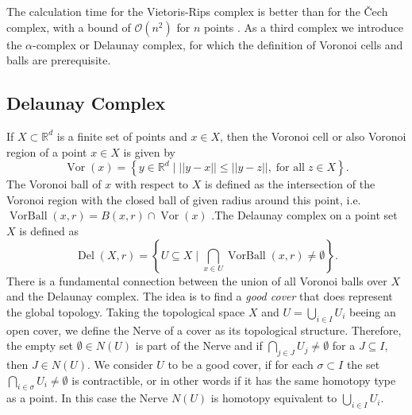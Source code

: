 \documentclass[runningheads]{llncs}
\DeclareMathOperator{\VorBall}{\text{VorBall}}
\DeclareMathOperator{\Vor}{\text{Vor}}
\DeclareMathOperator{\Del}{\text{Del}}
\begin{document}
The calculation time for the Vietoris-Rips complex is better than for the \v{C}ech complex, with a bound of $\mathcal{O}(n^2)$ for $n$ points \cite{Zomorodian10}. As a third complex we introduce the $\alpha$-complex or Delaunay complex, for which the definition of Voronoi cells and balls are prerequisite.


\subsection{Delaunay Complex}
If $X \subset \mathbb{R}^d$ is a finite set of points and $x \in X$, then the Voronoi cell or also Voronoi region of a point $x \in X$ is given by
\begin{equation}
\label{voronoicell}
\Vor(x) = \left\{ y \in \mathbb{R}^d \; \bigg\vert \; ||y-x|| \leq ||y-z||, \; \text{for all} \; z \in X \right\}.
\end{equation}
The Voronoi ball of $x$ with respect to $X$ is defined as the intersection of the Voronoi region with the closed ball of given radius around this point, i.e.   $\VorBall(x,r) = B(x,r) \cap \Vor(x)$ \cite{bauer2017morse}.The Delaunay complex on a point set $X$ is defined as
\begin{equation}
\label{delaunay}
  \Del(X,r) = \left\{ U \subseteq X \; \bigg\rvert \; \bigcap_{x\in U} \VorBall(x,r) \neq \emptyset \right\}.
\end{equation}
There is a fundamental connection between the union of all Voronoi balls over $X$ and the Delaunay complex. The idea is to find a \textit{good cover} that does represent the global topology. Taking the topological space $X$ and $U = \bigcup_{i \in I} U_i$ beeing an open cover, we define the Nerve of a cover as its topological structure. Therefore, the empty set $\emptyset \in N(U)$ is part of the Nerve and if $\bigcap_{j\in J} U_j \neq \emptyset$ for a $J \subseteq I$, then $J \in N(U)$. We consider $U$ to be a good cover, if for each $\sigma \subset I$ the set $\bigcap_{i\in \sigma} U_i \neq \emptyset$ is contractible, or in other words if it has the same homotopy type as a point. In this case the Nerve $N(U)$ is homotopy equivalent to $\bigcup_{i \in I} U_i$.
\end{document}
